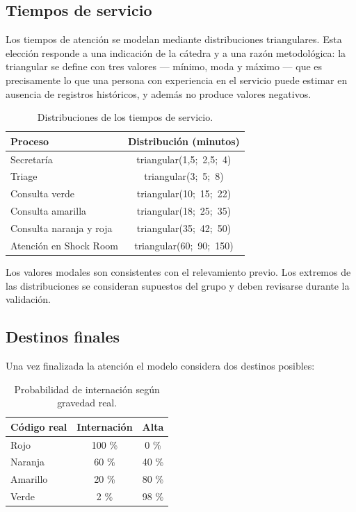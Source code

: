 \subsection{Tiempos de servicio}

Los tiempos de atención se modelan mediante distribuciones triangulares. Esta
elección responde a una indicación de la cátedra y a una razón metodológica:
la triangular se define con tres valores --- mínimo, moda y máximo --- que es
precisamente lo que una persona con experiencia en el servicio puede estimar
en ausencia de registros históricos, y además no produce valores negativos.

\begin{table}[H]
\centering
\begin{tabular}{lc}
\toprule
\textbf{Proceso} & \textbf{Distribución (minutos)} \\
\midrule
Secretaría                  & triangular(1,5;\ 2,5;\ 4) \\
Triage                      & triangular(3;\ 5;\ 8) \\
Consulta verde              & triangular(10;\ 15;\ 22) \\
Consulta amarilla           & triangular(18;\ 25;\ 35) \\
Consulta naranja y roja     & triangular(35;\ 42;\ 50) \\
Atención en Shock Room      & triangular(60;\ 90;\ 150) \\
\bottomrule
\end{tabular}
\caption{Distribuciones de los tiempos de servicio.}
\label{tab:tiempos}
\end{table}

Los valores modales son consistentes con el relevamiento previo. Los extremos
de las distribuciones se consideran supuestos del grupo y deben revisarse
durante la validación.

\subsection{Destinos finales}

Una vez finalizada la atención el modelo considera dos destinos posibles:

\begin{table}[H]
\centering
\begin{tabular}{lcc}
\toprule
\textbf{Código real} & \textbf{Internación} & \textbf{Alta} \\
\midrule
Rojo     & 100 \% & 0 \% \\
Naranja  & 60 \%  & 40 \% \\
Amarillo & 20 \%  & 80 \% \\
Verde    & 2 \%   & 98 \% \\
\bottomrule
\end{tabular}
\caption{Probabilidad de internación según gravedad real.}
\label{tab:destinos}
\end{table}

